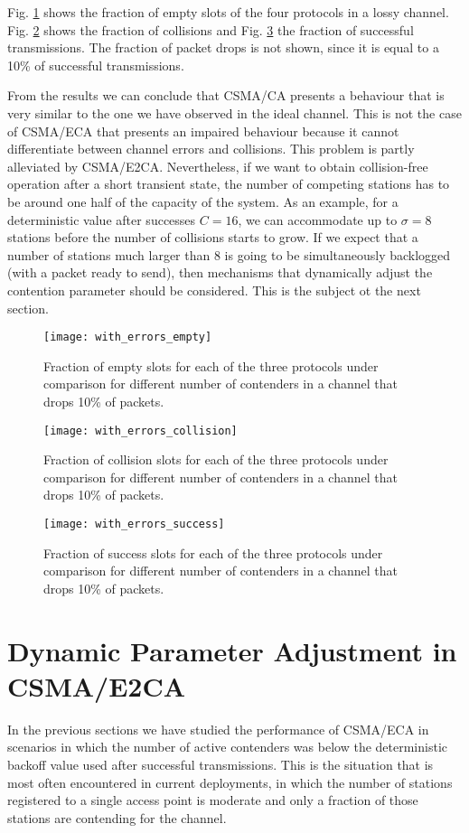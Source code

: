 \documentclass[journal]{IEEEtran}
\begin{document}
Fig. \ref{fig:with_errors_empty} shows the fraction of empty slots of the four protocols in a lossy channel. Fig. \ref{fig:with_errors_collision} shows the fraction of collisions and Fig. \ref{fig:with_errors_success} the fraction of successful transmissions. The fraction of packet drops is not shown, since it is equal to a 10\% of successful transmissions. 

From the results we can conclude that CSMA/CA presents a behaviour that is very similar to the one we have observed in the ideal channel. This is not the case of CSMA/ECA that presents an impaired behaviour because it cannot differentiate between channel errors and collisions. This problem is partly alleviated by CSMA/E2CA. Nevertheless, if we want to obtain collision-free operation after a short transient state, the number of competing stations has to be around one half of the capacity of the system. As an example, for a deterministic value after successes $C=16$, we can accommodate up to $\sigma=8$ stations before the number of collisions starts to grow. If we expect that a number of stations much larger than 8 is going to be simultaneously backlogged (with a packet ready to send), then mechanisms that dynamically adjust the contention parameter should be considered. This is the subject ot the next section.

\begin{figure}[!t]
\centering
\texttt{[image: with\_errors\_empty]}
\caption{Fraction of empty slots for each of the three protocols under comparison for different number of contenders in a channel that drops 10\% of packets.}
\label{fig:with_errors_empty}
\end{figure}

\begin{figure}[!t]
\centering
\texttt{[image: with\_errors\_collision]}
\caption{Fraction of collision slots for each of the three protocols under comparison for different number of contenders in a channel that drops 10\% of packets.}
\label{fig:with_errors_collision}
\end{figure}


\begin{figure}[!t]
\centering
\texttt{[image: with\_errors\_success]}
\caption{Fraction of success slots for each of the three protocols under comparison for different number of contenders in a channel that drops 10\% of packets.}
\label{fig:with_errors_success}
\end{figure}

\section{Dynamic Parameter Adjustment in CSMA/E2CA}
\label{sec:dpa}
In the previous sections we have studied the performance of CSMA/ECA in scenarios in which the number of active contenders was below the deterministic backoff value used after successful transmissions. This is the situation that is most often encountered in current deployments, in which the number of stations registered to a single access point is moderate and only a fraction of those stations are contending for the channel.
\end{document}
